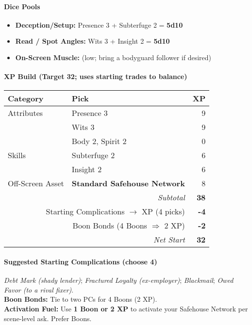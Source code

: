 \documentclass[11pt]{book}
\begin{document}
\paragraph{Dice Pools}
\begin{itemize}
  \item \textbf{Deception/Setup:} Presence 3 + Subterfuge 2 = \textbf{5d10}
  \item \textbf{Read / Spot Angles:} Wits 3 + Insight 2 = \textbf{5d10}
  \item \textbf{On-Screen Muscle:} (low; bring a bodyguard follower if desired)
\end{itemize}

\paragraph{XP Build (Target 32; uses starting trades to balance)}
\begin{tabular}{@{}llr@{}}
\toprule
\textbf{Category} & \textbf{Pick} & \textbf{XP} \\
\midrule
Attributes & Presence 3 & 9 \\
           & Wits 3 & 9 \\
           & Body 2, Spirit 2 & 0 \\
Skills     & Subterfuge 2 & 6 \\
           & Insight 2 & 6 \\
Off-Screen Asset & \textbf{Standard Safehouse Network} & 8 \\
\midrule
\multicolumn{2}{r}{\textit{Subtotal}} & \textbf{38} \\
\multicolumn{2}{r}{Starting Complications $\rightarrow$ XP (4 picks)} & \textbf{-4} \\
\multicolumn{2}{r}{Boon Bonds (4 Boons $\Rightarrow$ 2 XP)} & \textbf{-2} \\
\midrule
\multicolumn{2}{r}{\textit{Net Start}} & \textbf{32} \\
\bottomrule
\end{tabular}

\paragraph{Suggested Starting Complications (choose 4)}
\emph{Debt Mark (shady lender)}; \emph{Fractured Loyalty (ex-employer)}; \emph{Blackmail}; \emph{Owed Favor (to a rival fixer)}.\\
\textbf{Boon Bonds:} Tie to two PCs for 4 Boons (2 XP).\\
\textbf{Activation Fuel:} Use \textbf{1 Boon or 2 XP} to activate your Safehouse Network per scene-level ask. Prefer Boons.
\end{document}
